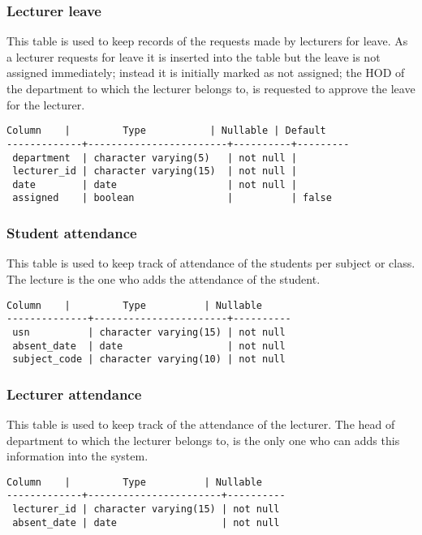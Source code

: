 \newpage
\subsubsection{Lecturer leave}

This table is used to keep records of the requests made by lecturers for leave.
As a lecturer requests for leave it is inserted into the table but the leave is
not assigned immediately; instead it is initially marked as not assigned; the
HOD of the department to which the lecturer belongs to, is requested to approve
the leave for the lecturer.

\begin{lstlisting}[basicstyle=\small]
   Column    |         Type           | Nullable | Default
-------------+------------------------+----------+---------
 department  | character varying(5)   | not null |
 lecturer_id | character varying(15)  | not null |
 date        | date                   | not null |
 assigned    | boolean                |          | false
\end{lstlisting}

\subsubsection{Student attendance}

This table is used to keep track of attendance of the students per subject or
class. The lecture is the one who adds the attendance of the student.

\begin{lstlisting}[basicstyle=\small]
    Column    |         Type          | Nullable
--------------+-----------------------+----------
 usn          | character varying(15) | not null
 absent_date  | date                  | not null
 subject_code | character varying(10) | not null
\end{lstlisting}

\subsubsection{Lecturer attendance}

This table is used to keep track of the attendance of the lecturer. The head of
department to which the lecturer belongs to, is the only one who can adds this
information into the system.

\begin{lstlisting}[basicstyle=\small]
   Column    |         Type          | Nullable
-------------+-----------------------+----------
 lecturer_id | character varying(15) | not null
 absent_date | date                  | not null
\end{lstlisting}

